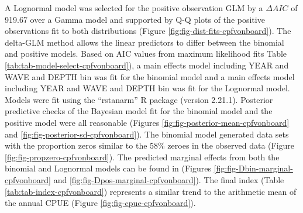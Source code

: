 \documentclass[11pt,
  english,
  a4paper,
]{article}
\begin{document}
A Lognormal model was selected for the positive observation GLM by a {\(\Delta AIC\)\leavevmode\tagmcend\tagstructend} of 919.67 over a Gamma model and supported by Q-Q plots of the positive observations fit to both distributions (Figure \ref{fig:fig-dist-fits-cpfvonboard}). The delta-GLM method allows the linear predictors to differ between the binomial and positive models. Based on AIC values from maximum likelihood fits Table \ref{tab:tab-model-select-cpfvonboard}), a main effects model including YEAR and WAVE and DEPTH bin was fit for the binomial model and a main effects model including YEAR and WAVE and DEPTH bin was fit for the Lognormal model. Models were fit using the ``rstanarm'' R package (version 2.21.1). Posterior predictive checks of the Bayesian model fit for the binomial model and the positive model were all reasonable (Figures \ref{fig:fig-posterior-mean-cpfvonboard} and \ref{fig:fig-posterior-sd-cpfvonboard}). The binomial model generated data sets with the proportion zeros similar to the 58\% zeroes in the observed data (Figure \ref{fig:fig-propzero-cpfvonboard}). The predicted marginal effects from both the binomial and Lognormal models can be found in (Figures \ref{fig:fig-Dbin-marginal-cpfvonboard} and \ref{fig:fig-Dpos-marginal-cpfvonboard}). The final index (Table \ref{tab:tab-index-cpfvonboard}) represents a similar trend to the arithmetic mean of the annual CPUE (Figure \ref{fig:fig-cpue-cpfvonboard}).

\newpage
\end{document}
